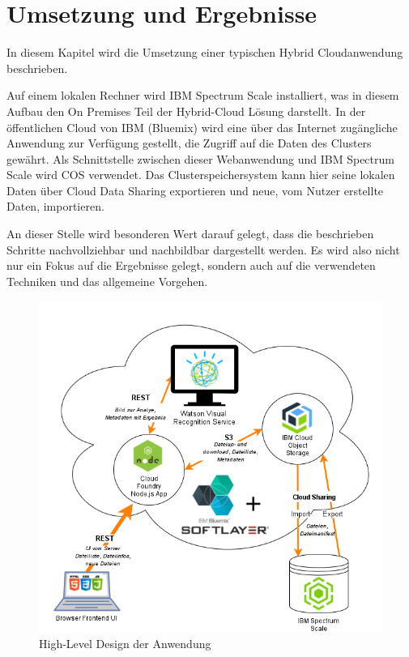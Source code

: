 \chapter{Umsetzung und Ergebnisse}\label{ch:realization}

In diesem Kapitel wird die Umsetzung einer typischen Hybrid Cloudanwendung beschrieben. 

Auf einem lokalen Rechner wird IBM Spectrum Scale installiert, was in diesem Aufbau den \gls{On Premise}s Teil der Hybrid-Cloud Lösung darstellt.
In der öffentlichen Cloud von IBM (Bluemix) wird eine über das Internet zugängliche Anwendung zur Verfügung gestellt, die Zugriff auf die Daten des Clusters gewährt. Als Schnittstelle zwischen dieser Webanwendung und IBM Spectrum Scale wird \ac{COS} verwendet. Das Clusterspeichersystem kann hier seine lokalen Daten über Cloud Data Sharing exportieren und neue, vom Nutzer erstellte Daten, importieren.

An dieser Stelle wird besonderen Wert darauf gelegt, dass die beschrieben Schritte nachvollziehbar und nachbildbar dargestellt werden. Es wird also nicht nur ein Fokus auf die Ergebnisse gelegt, sondern auch auf die verwendeten Techniken und das allgemeine Vorgehen.

\begin{figure}[hbt]
	\centering
	\includegraphics[scale=0.7]{images/demo-architecture-overview}
	\caption{High-Level Design der Anwendung}
	\label{fig:demoarchitectureoverview}
\end{figure}

